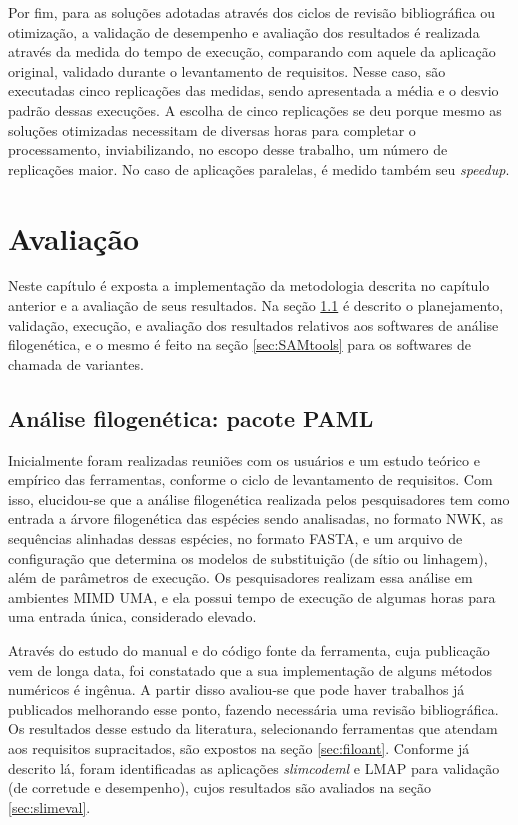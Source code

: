 \documentclass[cic,tc]{iiufrgs}
\begin{document}
Por fim, para as soluções adotadas através dos ciclos de revisão bibliográfica
ou otimização, a validação de desempenho e avaliação dos resultados é realizada
através da medida do tempo de execução, comparando com aquele da aplicação
original, validado durante o levantamento de requisitos. Nesse caso, são
executadas cinco replicações das medidas, sendo apresentada a média e o desvio
padrão dessas execuções. A escolha de cinco replicações se deu porque mesmo as
soluções otimizadas necessitam de diversas horas para completar o
processamento, inviabilizando, no escopo desse trabalho, um número de
replicações maior. No caso de aplicações paralelas, é medido também seu
\textit{speedup}. 

%
%
%
%
\chapter{Avaliação}
\label{chap:imp}

Neste capítulo é exposta a implementação da metodologia descrita no capítulo
anterior e a avaliação de seus resultados. Na seção \ref{sec:filomp} é descrito
o planejamento, validação, execução, e avaliação dos resultados relativos aos
softwares de análise filogenética, e o mesmo é feito na seção
\ref{sec:SAMtools} para os softwares de chamada de variantes.

\section{Análise filogenética: pacote PAML}
\label{sec:filomp}

Inicialmente foram realizadas reuniões com os usuários e um estudo teórico e
empírico das ferramentas, conforme o ciclo de levantamento de requisitos. Com
isso, elucidou-se que a análise filogenética realizada pelos pesquisadores tem
como entrada a árvore filogenética das espécies sendo analisadas, no formato
NWK, as sequências alinhadas dessas espécies, no formato FASTA, e um arquivo de
configuração que determina os modelos de substituição (de sítio ou linhagem),
além de parâmetros de execução. Os pesquisadores realizam essa análise em
ambientes MIMD UMA, e ela possui tempo de execução de algumas horas para uma
entrada única, considerado elevado.

Através do estudo do manual e do código fonte da ferramenta, cuja publicação
vem de longa data, foi constatado que a sua implementação de alguns métodos
numéricos é ingênua. A partir disso avaliou-se que pode haver trabalhos já
publicados melhorando esse ponto, fazendo necessária uma revisão bibliográfica.
Os resultados desse estudo da literatura, selecionando ferramentas que atendam
aos requisitos supracitados, são expostos na seção \ref{sec:filoant}. Conforme
já descrito lá, foram identificadas as aplicações \textit{slimcodeml} e LMAP
para validação (de corretude e desempenho), cujos resultados são avaliados na
seção \ref{sec:slimeval}.
\end{document}
